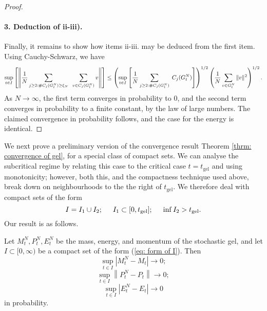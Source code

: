 \begin{proof}
\paragraph{3. Deduction of ii-iii).} Finally, it remains to show how items ii-iii. may be deduced from the first item. Using Cauchy-Schwarz, we have \begin{equation}
    \sup_{t\in I}\left[\left\|\frac{1}{N}\sum_{j\geq 2: \#C_j(G^N_t)\geq \xi_N}\hspace{0.2cm} \sum_{v\in C_j(G^N_t)}v\right\|\right] \leq \left(\sup_{t\in I}\left[\frac{1}{N} \sum_{j\geq 2: \#C_j(G^N_t)}\hspace{0.1cm} C_j(G^N_t)\right]\right)^{1/2}\left(\frac{1}{N}\sum_{v\in G^N_t} \|v\|^2\right)^{1/2}.
\end{equation} 
As $N\rightarrow \infty$, the first term converges in probability to $0$, and the second term converges in probability to a finite constant, by the law of large numbers. The claimed convergence in probability follows, and the case for the energy is identical. \end{proof} 
We next prove a preliminary version of the convergence result Theorem \ref{thrm: convergence of gel}, for a special class of compact sets. We can analyse the subcritical regime by relating this case to the critical case $t=t_\text{gel}$ and using monotonicity; however, both this, and the compactness technique used above, break down on neighbourhoods to the the right of $t_\text{gel}$. We therefore deal with compact sets of the form \begin{equation}
    \label{eq: form of I}
I=I_1\cup I_2; \hspace{0.5cm} I_1\subset [0, t_\text{gel}]; \hspace{0.5cm}\inf I_2 >t_\text{gel}. \end{equation} Our result is as follows.
\begin{lemma}\label{lemma: preliminary CoG} Let $M^N_t, P^N_t, E^N_t$ be the mass, energy, and momentum of the stochastic gel, and let $I\subset [0,\infty)$ be a compact set of the form (\ref{eq: form of I}). Then \begin{equation}
    \sup_{t\in I}\left|M^N_t - M_t\right|\rightarrow 0;
\end{equation} \begin{equation}
    \sup_{t\in I}\left\|P^N_t - P_t\right\|\rightarrow 0;
\end{equation} \begin{equation}
    \sup_{t\in I}\left|E^N_t - E_t\right|\rightarrow 0
\end{equation} in probability. \end{lemma}
